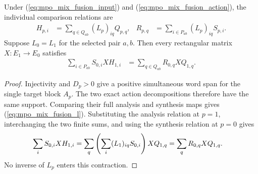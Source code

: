 \begin{lemma}
    \label{thm:mpo_mixed_fusion_cross}
    \leanok
    Under (\ref{eq:mpo_mix_fusion_input}) and
    (\ref{eq:mpo_mix_fusion_action}), the individual comparison relations are
    \begin{align}
        H_{p,i} & =\sum_{q\in Q_{ab}}(L_p)_{iq}Q_{p,q},
                & R_{p,q}                               & =\sum_{i\in P_{ab}}(L_p)_{iq}S_{p,i}.
        \label{eq:mpo_mix_fusion_l}
    \end{align}
    Suppose $L_0=L_1$ for the selected
    pair $a,b$. Then every rectangular matrix $X:E_1\to E_0$ satisfies
    \begin{align}
        \sum_{i\in P_{ab}}S_{0,i}XH_{1,i}
         & =\sum_{q\in Q_{ab}}R_{0,q}XQ_{1,q}.
        \label{eq:mpo_mix_fusion_cross}
    \end{align}
\end{lemma}
\begin{proof}
    \leanok
    Injectivity and $D_p>0$ give a positive simultaneous word span
    for the single target block $A_p$. The two exact action
    decompositions therefore have the same support. Comparing their
    full analysis and synthesis maps gives (\ref{eq:mpo_mix_fusion_l}).
    Substituting the analysis relation at $p=1$, interchanging the two
    finite sums, and using the synthesis relation at $p=0$ gives
    \begin{align}
        \sum_i S_{0,i}XH_{1,i}
         & =\sum_q\left(\sum_i(L_1)_{iq}S_{0,i}\right)XQ_{1,q}
        =\sum_qR_{0,q}XQ_{1,q}.\notag
    \end{align}
    No inverse of $L_p$ enters this contraction.
\end{proof}

